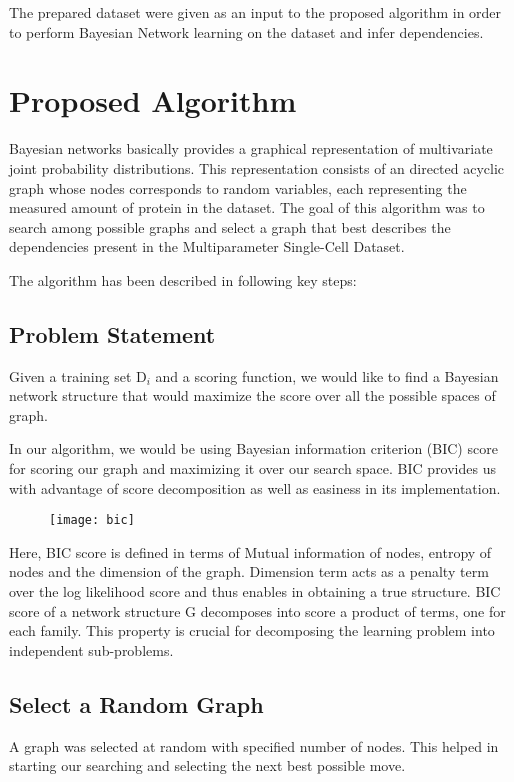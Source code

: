 \documentclass[conference]{IEEEtran}
\begin{document}
\par
The prepared dataset were given as an input to the proposed algorithm in order to perform Bayesian Network learning on the dataset and infer dependencies.

\section{Proposed Algorithm}
Bayesian networks basically provides a graphical representation of multivariate joint probability distributions. This representation consists of an directed acyclic graph whose nodes corresponds to random variables, each representing the measured amount of protein in the dataset. The goal of this algorithm was to search among possible graphs and select a graph that best describes the dependencies present in the Multiparameter Single-Cell Dataset.
\par
The algorithm has been described in following key steps:
\subsection{Problem Statement}
Given a training set $\mathrm{D}_i$ and a scoring function, we would like to find a Bayesian network structure that would maximize the score over all the possible spaces of graph.
\par
In our algorithm, we would be using Bayesian information criterion (BIC) score for scoring our graph and maximizing it over our search space. BIC provides us with advantage of score decomposition as well as easiness in its implementation.
\begin{figure}[h]
\centering
\texttt{[image: bic]}
\end{figure}
\par
Here, BIC score is defined in terms of Mutual information of nodes, entropy of nodes and the dimension of the graph. Dimension term acts as a penalty term over the log likelihood score and thus enables in obtaining a true structure. BIC score of a network structure $\mathrm{G}$ decomposes into score a product of terms, one for each family. This property is crucial for decomposing the learning problem into independent sub-problems.
\subsection{Select a Random Graph}
A graph was selected at random with specified number of nodes. This helped in starting our searching and selecting the next best possible move.
\end{document}
